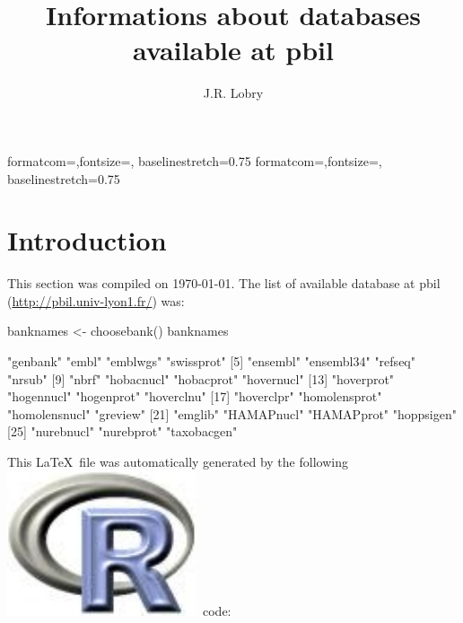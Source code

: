 \documentclass{article}
\title{Informations about databases available at pbil}
\author{J.R. Lobry}
\begin{document}
%
%
{formatcom={\color{Sinput}},fontsize=\footnotesize, baselinestretch=0.75}
{formatcom={\color{Soutput}},fontsize=\footnotesize, baselinestretch=0.75}
%
%
\newcommand{\Rlogo}{\protect\includegraphics[height=1.8ex,keepaspectratio]{../figs/Rlogo.pdf}}
%
%
\newcommand{\seqinr}{\texttt{seqin\bf{R}}}
\newcommand{\Seqinr}{\texttt{Seqin\bf{R}}}
%
%
%
%
%


\maketitle
\label{subsequence}

\section{Introduction}
This section was compiled on \today. The list of available database at pbil 
(\url{http://pbil.univ-lyon1.fr/}) was:

\begin{Schunk}
\begin{Sinput}
 banknames <- choosebank()
 banknames
\end{Sinput}
\begin{Soutput}
 [1] "genbank"      "embl"         "emblwgs"      "swissprot"   
 [5] "ensembl"      "ensembl34"    "refseq"       "nrsub"       
 [9] "nbrf"         "hobacnucl"    "hobacprot"    "hovernucl"   
[13] "hoverprot"    "hogennucl"    "hogenprot"    "hoverclnu"   
[17] "hoverclpr"    "homolensprot" "homolensnucl" "greview"     
[21] "emglib"       "HAMAPnucl"    "HAMAPprot"    "hoppsigen"   
[25] "nurebnucl"    "nurebprot"    "taxobacgen"  
\end{Soutput}
\end{Schunk}

This \LaTeX~file was automatically generated by the following \Rlogo{}~code:
\end{document}
